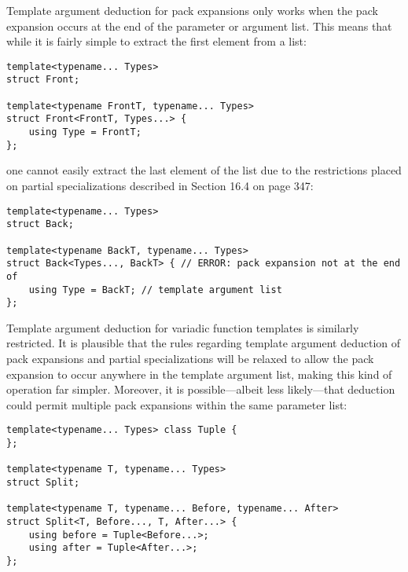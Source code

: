 Template argument deduction for pack expansions only works when the pack expansion occurs at the end of the parameter or argument list. This means that while it is fairly simple to extract the first element from a list:

\begin{lstlisting}[style=styleCXX]
template<typename... Types>
struct Front;

template<typename FrontT, typename... Types>
struct Front<FrontT, Types...> {
	using Type = FrontT;
};
\end{lstlisting}

one cannot easily extract the last element of the list due to the restrictions placed on partial specializations described in Section 16.4 on page 347:

\begin{lstlisting}[style=styleCXX]
template<typename... Types>
struct Back;

template<typename BackT, typename... Types>
struct Back<Types..., BackT> { // ERROR: pack expansion not at the end of
	using Type = BackT; // template argument list
};
\end{lstlisting}

Template argument deduction for variadic function templates is similarly restricted. It is plausible that the rules regarding template argument deduction of pack expansions and partial specializations will be relaxed to allow the pack expansion to occur anywhere in the template argument list, making this kind of operation far simpler. Moreover, it is possible—albeit less likely—that deduction could permit multiple pack expansions within the same parameter list:

\begin{lstlisting}[style=styleCXX]
template<typename... Types> class Tuple {
};

template<typename T, typename... Types>
struct Split;

template<typename T, typename... Before, typename... After>
struct Split<T, Before..., T, After...> {
	using before = Tuple<Before...>;
	using after = Tuple<After...>;
};
\end{lstlisting}

